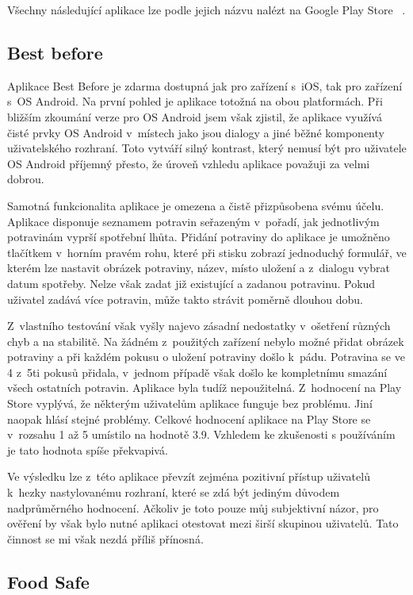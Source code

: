 \documentclass[thesis=B,czech]{FITthesis}[2013/10/20]
\begin{document}
Všechny následující aplikace lze podle jejich názvu nalézt na Google Play Store ~\cite{play_store}.

\subsection{Best before}

Aplikace Best Before je zdarma dostupná jak pro zařízení s~iOS, tak pro zařízení s~OS Android. Na první pohled je aplikace totožná na obou platformách. Při bližším zkoumání verze pro OS Android jsem však zjistil, že aplikace využívá čisté prvky OS Android v~místech jako jsou dialogy a jiné běžné komponenty uživatelského rozhraní. Toto vytváří silný kontrast, který nemusí být pro uživatele OS Android příjemný přesto, že úroveň vzhledu aplikace považuji za velmi dobrou.

Samotná funkcionalita aplikace je omezena a čistě přizpůsobena svému účelu. Aplikace disponuje seznamem potravin seřazeným v~pořadí, jak jednotlivým potravinám vyprší spotřební lhůta. Přidání potraviny do aplikace je umožněno tlačítkem v~horním pravém rohu, které při stisku zobrazí jednoduchý formulář, ve kterém lze nastavit obrázek potraviny, název, místo uložení a z~dialogu vybrat datum spotřeby. Nelze však zadat již existující a zadanou potravinu. Pokud uživatel zadává více potravin, může takto strávit poměrně dlouhou dobu.

Z~vlastního testování však vyšly najevo zásadní nedostatky v~ošetření různých chyb a na stabilitě. Na žádném z~použitých zařízení nebylo možné přidat obrázek potraviny a při každém pokusu o uložení potraviny došlo k~pádu. Potravina se ve 4 z~5ti pokusů přidala, v~jednom případě však došlo ke kompletnímu smazání všech ostatních potravin. Aplikace byla tudíž nepoužitelná. Z~hodnocení na Play Store vyplývá, že některým uživatelům aplikace funguje bez problému. Jiní naopak hlásí stejné problémy. Celkové hodnocení aplikace na Play Store se v~rozsahu 1 až 5 umístilo na hodnotě 3.9. Vzhledem ke zkušenosti s používáním je tato hodnota spíše překvapivá.

Ve výsledku lze z~této aplikace převzít zejména pozitivní přístup uživatelů k~hezky nastylovanému rozhraní, které se zdá být jediným důvodem nadprůměrného hodnocení. Ačkoliv je toto pouze můj subjektivní názor, pro ověření by však bylo nutné aplikaci otestovat mezi širší skupinou uživatelů. Tato činnost se mi však nezdá příliš přínosná.

\subsection{Food Safe}
\end{document}
